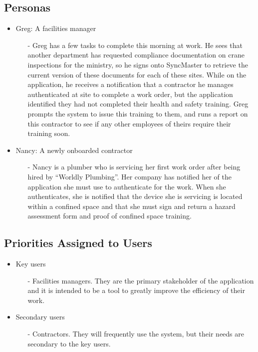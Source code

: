 \documentclass[12pt]{article}
\begin{document}
\subsection{Personas}

\begin{itemize}
  \item Greg: A facilities manager
    \begin{itemize}
      \item[-] Greg has a few tasks to complete this morning at work.
        He sees that another department has requested compliance documentation
        on crane inspections for the ministry, so he signs onto SyncMaster to
        retrieve the current version of these documents for each of these sites.
        While on the application, he receives a notification that a contractor
        he manages authenticated at site to complete a work order, but the
        application identified they had not completed their health and safety
        training. Greg prompts the system to issue this training to them, and
        runs a report on this contractor to see if any other employees of
        theirs require their training soon.
    \end{itemize}
  \item Nancy: A newly onboarded contractor
    \begin{itemize}
      \item[-] Nancy is a plumber who is servicing her first work order after
        being hired by ``Worldly Plumbing''.
        Her company has notified her of the application she must use to
        authenticate for the work. When she authenticates, she is notified that
        the device she is servicing is located within a confined space
        and that she must sign and return a hazard assessment form and proof
        of confined space training.
    \end{itemize}
\end{itemize}
\subsection{Priorities Assigned to Users}

\begin{itemize}
  \item Key users
    \begin{itemize}
      \item[-] Facilities managers. They are the primary stakeholder of the
        application and it is intended to be a tool to greatly improve the
        efficiency of their work.
    \end{itemize}
  \item Secondary users
    \begin{itemize}
      \item[-] Contractors. They will frequently use the system, but their
        needs are secondary to the key users.
    \end{itemize}
\end{itemize}
\end{document}
